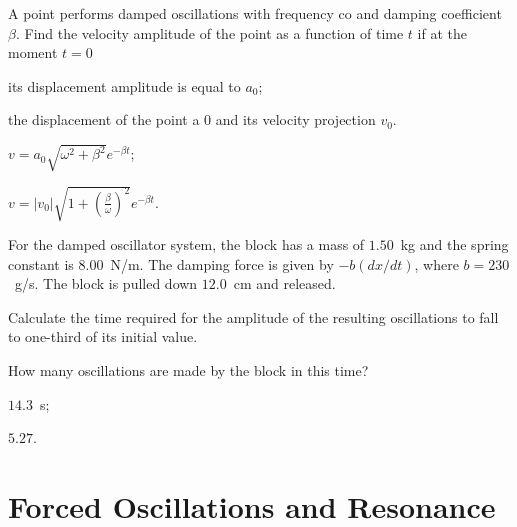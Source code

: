 \begin{problem}
	A point performs damped oscillations with frequency co and damping coefficient $\beta$. Find the velocity amplitude of the point as a function of time $t$ if at the moment $t = 0$
	\begin{enumerate*}[label=(\alph*)]
		\item its displacement amplitude is equal to $a_0$;
		\item the displacement of the point a $0$ and its velocity projection $v_0$.
	\end{enumerate*}
	\begin{solution}
		\begin{enumerate*}[label=(\alph*)]
			\item $v = a_0\sqrt{\omega^2 + \beta^2}e^{-\beta t}$;
			\item $v = |v_0|  \sqrt{1 +  \left( \frac{\beta}{\omega}\right)^2}e^{-\beta t}$.
		\end{enumerate*}	
	\end{solution}
\end{problem}


\begin{problem}
	For the damped oscillator system, the block has a mass of $1.50$~kg and the spring constant is $8.00$~N/m. The damping force is given by $-b(dx/dt)$, where $b = 230$~g/s. The block is pulled down $12.0$~cm and released. 
	\begin{enumerate*}[label=(\alph*)]
		\item Calculate the time required for the amplitude of the resulting oscillations to fall to one-third of its initial value. 
		\item How many oscillations are made by the block in this time?
	\end{enumerate*} 
	\begin{solution}
		\begin{enumerate*}[label=(\alph*)]
			\item $14.3$~s; 
			\item $5.27$.
		\end{enumerate*}
	\end{solution}
\end{problem}


\section{Forced Oscillations and Resonance}


